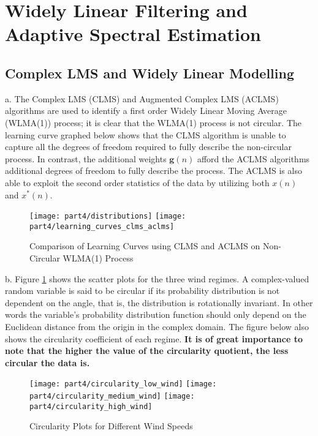 \section{Widely Linear Filtering and Adaptive Spectral Estimation}

\subsection{Complex LMS and Widely Linear Modelling}
\noindent{}a. The Complex LMS (CLMS) and Augmented Complex LMS (ACLMS) algorithms are used to identify a first order Widely Linear Moving Average (WLMA(1)) process; it is clear that the WLMA(1) process is not circular. The learning curve graphed below shows that the CLMS algorithm is unable to capture all the degrees of freedom required to fully describe the non-circular process. In contrast, the additional weights $\textbf{g}(n)$ afford the ACLMS algorithms additional degrees of freedom to fully describe the process. The ACLMS is also able to exploit the second order statistics of the data by utilizing both $x(n)$ and $x^*(n)$.

\begin{figure}[H]
\centering{}
\texttt{[image: part4/distributions]}
\texttt{[image: part4/learning\_curves\_clms\_aclms]}
\caption{Comparison of Learning Curves using CLMS and ACLMS on Non-Circular WLMA(1) Process}
\end{figure}

\noindent{}b. Figure \ref{fig:wind_circularity} shows the scatter plots for the three wind regimes. A complex-valued random variable is said to be circular if its probability distribution is not dependent on the angle, that is, the distribution is rotationally invariant. In other words the variable's probability distribution function should only depend on the Euclidean distance from the origin in the complex domain. The figure below also shows the circularity coefficient of each regime.\textbf{ It is of great importance to note that the higher the value of the circularity quotient, the less circular the data is.}

\begin{figure}[H]
\centering{}
\texttt{[image: part4/circularity\_low\_wind]}
\texttt{[image: part4/circularity\_medium\_wind]}
\texttt{[image: part4/circularity\_high\_wind]}
\caption{Circularity Plots for Different Wind Speeds}
\label{fig:wind_circularity}
\end{figure}

